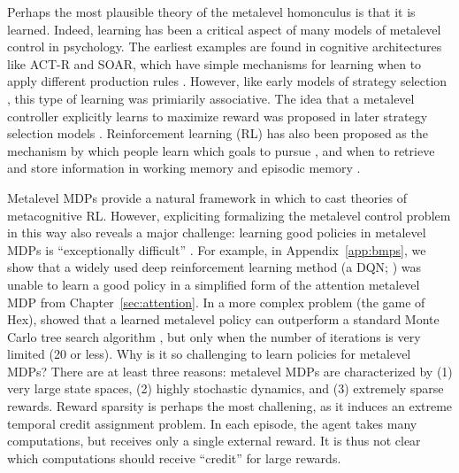 Perhaps the most plausible theory of the metalevel homonculus is that it is learned. Indeed, learning has been a critical aspect of many models of metalevel control in psychology. The earliest examples are found in cognitive architectures like ACT-R and SOAR, which have simple mechanisms for learning when to apply different production rules \citep{laird1986chunking}. However, like early models of strategy selection \citep{shrager1998scads}, this type of learning was primiarily associative. The idea that a metalevel controller explicitly learns to maximize reward was proposed in later strategy selection models \citet{erev2005adaptation,rieskamp2006ssl,lieder2017strategy}. Reinforcement learning (RL) has also been proposed as the mechanism by which people learn which goals to pursue \citep{cushman2015habitual}, and when to retrieve and store information in working memory \citep{oreilly2006making,todd2008learning} and episodic memory \citep{lu2022neural}. 

Metalevel MDPs provide a natural framework in which to cast theories of metacognitive RL. However, expliciting formalizing the metalevel control problem in this way also reveals a major challenge: learning good policies in metalevel MDPs is ``exceptionally difficult'' \citep{hay2016principles}. For example, in Appendix~\ref{app:bmps}, we show that a widely used deep reinforcement learning method (a DQN; \citealp{mnih2015humanlevel}) was unable to learn a good policy in a simplified form of the attention metalevel MDP from Chapter~\ref{sec:attention}. In a more complex problem (the game of Hex), \citet{hay2016principles} showed that a learned metalevel policy can outperform a standard Monte Carlo tree search algorithm \citep{kocsis2006bandit}, but only when the number of iterations is very limited (20 or less). Why is it so challenging to learn policies for metalevel MDPs? There are at least three reasons: metalevel MDPs are characterized by (1) very large state spaces, (2) highly stochastic dynamics, and (3) extremely sparse rewards. Reward sparsity is perhaps the most challening, as it induces an extreme temporal credit assignment problem. In each episode, the agent takes many computations, but receives only a single external reward. It is thus not clear which computations should receive ``credit'' for large rewards. 

